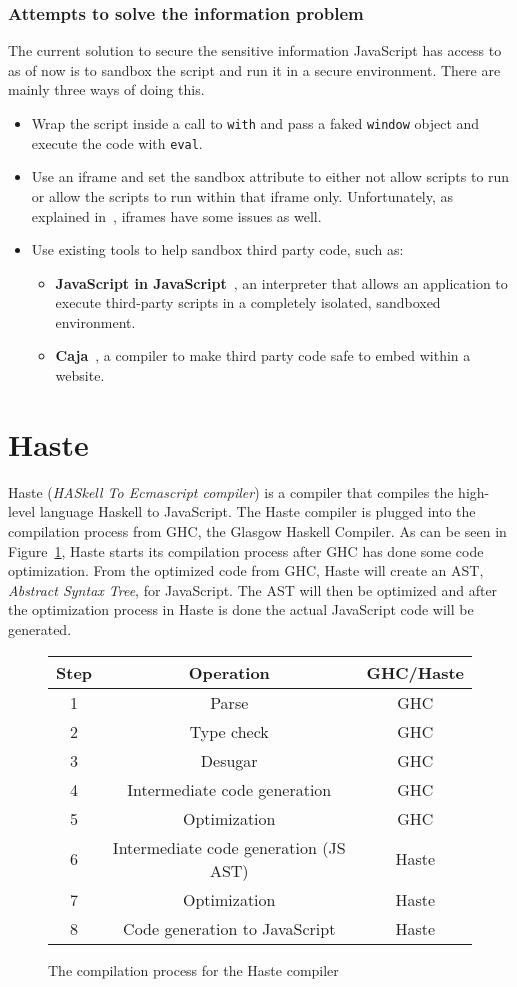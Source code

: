 \subsubsection{Attempts to solve the information problem}
The current solution to secure the sensitive information JavaScript has access to as of now is to sandbox the script and run it in a secure environment. There are mainly three ways of doing this.
\begin{itemize}
  \item Wrap the script inside a call to {\tt with} and pass a faked {\tt window} object and execute the code with {\tt eval}.
  \item Use an iframe and set the sandbox attribute to either not allow scripts to run or allow the scripts to run within that iframe only. Unfortunately, as explained in~\cite{js_in_js}, iframes have some issues as well.
  \item Use existing tools to help sandbox third party code, such as:
    \begin{itemize}
      \item \textbf{JavaScript in JavaScript}~\cite{js_in_js}, an interpreter that allows an application to execute third-party scripts in a completely isolated, sandboxed environment.
      \item \textbf{Caja}~\cite{caja_spec}, a compiler to make third party code safe to embed within a website.
    \end{itemize}
\end{itemize}
\section{Haste}
Haste (\emph{HASkell To Ecmascript compiler}) is a compiler that compiles the high-level language Haskell to JavaScript. The Haste compiler is plugged into the compilation process from GHC, the Glasgow Haskell Compiler. As can be seen in Figure~\ref{fig:system}, Haste starts its compilation process after GHC has done some code optimization. From the optimized code from GHC, Haste will create an AST, \emph{Abstract Syntax Tree}, for JavaScript. The AST will then be optimized and after the optimization process in Haste is done the actual JavaScript code will be generated.
\begin{figure}[h]
  \begin{tabular}{|c|c|c|}
    \hline
    Step & Operation & GHC/Haste \\
    \hline
    1 & Parse & GHC \\
    2 & Type check & GHC \\
    3 & Desugar & GHC \\
    4 & Intermediate code generation & GHC \\
    5 & Optimization & GHC \\
    6 & Intermediate code generation (JS AST) & Haste \\
    7 & Optimization & Haste \\
    8 & Code generation to JavaScript & Haste \\
    \hline
  \end{tabular}
  \caption{The compilation process for the Haste compiler}
  \label{fig:system}
\end{figure}

